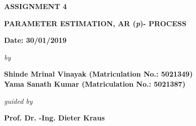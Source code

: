\begin{center}
\vspace{-2.2cm}
\vspace{2.5cm}
\bfseries{ASSIGNMENT 4}\\
\vspace{0.5cm}
\begin{large}
{\bfseries PARAMETER ESTIMATION, AR (\textit{p})- PROCESS }\\
\end{large}
\vspace{0.5cm}
{\bfseries Date: 30/01/2019 }\\
\vspace{0.4cm}
\begin{small}
\emph{by}\\
\end{small}
\vspace{0.4cm}
\bfseries{Shinde Mrinal Vinayak (Matriculation No.: 5021349)\\Yama Sanath Kumar (Matriculation No.: 5021387)}\\
\vspace{0.3cm}
\begin{small}
\emph{guided by}\\
\end{small}
\vspace{0.3cm}
{\bfseries \large Prof. Dr. -Ing. Dieter Kraus}\\
\vspace{0.1cm}
\end{center}